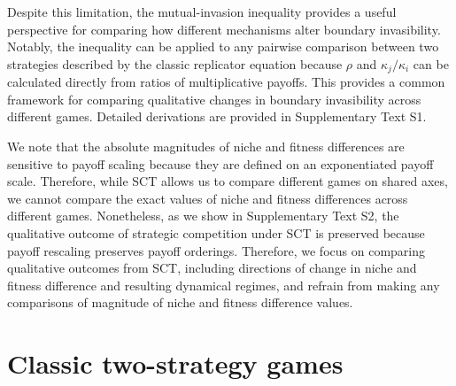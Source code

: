 \documentclass[12pt]{article}
\begin{document}
Despite this limitation, the mutual-invasion inequality provides a useful perspective for comparing how different mechanisms alter boundary invasibility.
Notably, the inequality can be applied to any pairwise comparison between two strategies described by the classic replicator equation because $\rho$ and $\kappa_j/\kappa_i$ can be calculated directly from ratios of multiplicative payoffs.
This provides a common framework for comparing qualitative changes in boundary invasibility across different games.
Detailed derivations are provided in Supplementary Text S1.

We note that the absolute magnitudes of niche and fitness differences are sensitive to payoff scaling because they are defined on an exponentiated payoff scale.
Therefore, while SCT allows us to compare different games on shared axes, we cannot compare the exact values of niche and fitness differences across different games.
Nonetheless, as we show in Supplementary Text S2, the qualitative outcome of strategic competition under SCT is preserved because payoff rescaling preserves payoff orderings.
Therefore, we focus on comparing qualitative outcomes from SCT, including directions of change in niche and fitness difference and resulting dynamical regimes, and refrain from making any comparisons of magnitude of niche and fitness difference values.

\section*{Classic two-strategy games}
\end{document}
